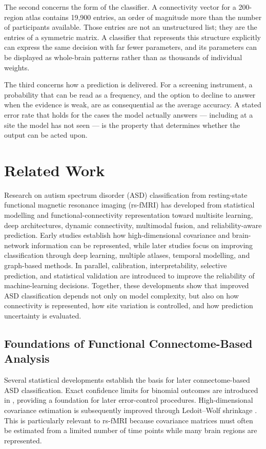 \documentclass[a4paper,fleqn]{cas-sc}
\begin{document}
The second concerns the form of the classifier. A connectivity vector for a 200-region atlas contains 19,900 entries, an order of magnitude more than the number of participants available. Those entries are not an unstructured list; they are the entries of a symmetric matrix. A classifier that represents this structure explicitly can express the same decision with far fewer parameters, and its parameters can be displayed as whole-brain patterns rather than as thousands of individual weights.

The third concerns how a prediction is delivered. For a screening instrument, a probability that can be read as a frequency, and the option to decline to answer when the evidence is weak, are as consequential as the average accuracy. A stated error rate that holds for the cases the model actually answers — including at a site the model has not seen — is the property that determines whether the output can be acted upon.

\section{Related Work}
\label{sec:related}

Research on autism spectrum disorder (ASD) classification from resting-state functional magnetic resonance imaging (rs-fMRI) has developed from statistical modelling and functional-connectivity representation toward multisite learning, deep architectures, dynamic connectivity, multimodal fusion, and reliability-aware prediction. Early studies establish how high-dimensional covariance and brain-network information can be represented, while later studies focus on improving classification through deep learning, multiple atlases, temporal modelling, and graph-based methods. In parallel, calibration, interpretability, selective prediction, and statistical validation are introduced to improve the reliability of machine-learning decisions. Together, these developments show that improved ASD classification depends not only on model complexity, but also on how connectivity is represented, how site variation is controlled, and how prediction uncertainty is evaluated.

\subsection{Foundations of Functional Connectome-Based Analysis}

Several statistical developments establish the basis for later connectome-based ASD classification. Exact confidence limits for binomial outcomes are introduced in \cite{ClopperPearson1934}, providing a foundation for later error-control procedures. High-dimensional covariance estimation is subsequently improved through Ledoit--Wolf shrinkage \cite{LedoitWolf2004}. This is particularly relevant to rs-fMRI because covariance matrices must often be estimated from a limited number of time points while many brain regions are represented.
\end{document}
